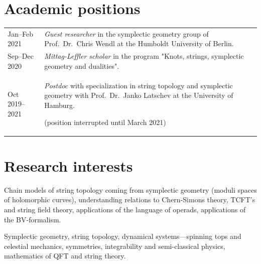 \documentclass[a4paper,12pt]{article}
\begin{document}
\section*{Academic positions}
%
\begin{tabularx}{\textwidth}{@{}lX@{}}
	Jan--Feb 2021 	&\emph{Guest researcher} in the symplectic geometry group of Prof.~Dr.~Chris Wendl at the Humboldt University of Berlin.\\
	Sep--Dec 2020 	&\emph{Mittag-Leffler scholar} in the program "Knots, strings, symplectic geometry and dualities". \\
	Oct 2019--2021 &\emph{Postdoc} with specialization in string topology and symplectic geometry with Prof.~Dr.~Janko Latschev at the University of Hamburg.

			(position interrupted until March 2021)
\end{tabularx}
%
\section*{Research interests}
%
\begin{description}[font=\normalfont\itshape,itemsep=0pt,parsep=0pt]
	\item[Actively:] Chain models of string topology coming from symplectic geometry (moduli spaces of holomorphic curves), understanding relations to Chern-Simons theory, TCFT's and string field theory, applications of the language of operads, applications of the BV-formalism.
	\item[Generally:] Symplectic geometry, string topology, dynamical systems---spinning tops and celestial mechanics, symmetries, integrability and semi-classical physics, mathematics of QFT and string theory.
\end{description}
%
\end{document}

